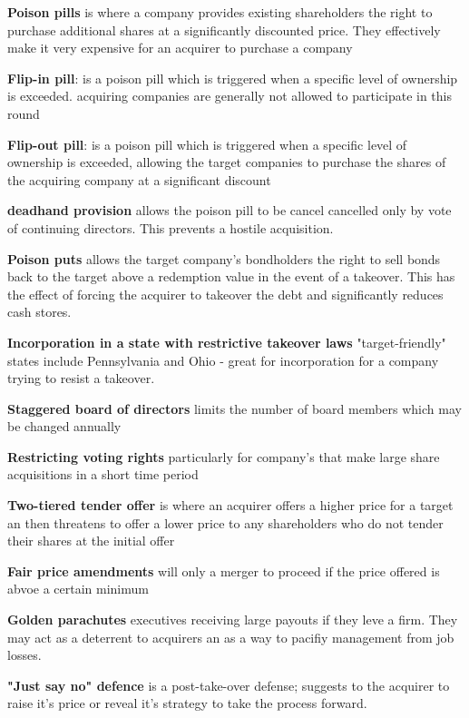 \documentclass[12pt]{article}
\begin{document}
			\textbf{Poison pills} is where a company provides existing shareholders the right to purchase additional shares at a significantly discounted price. They effectively make it very expensive for an acquirer to purchase a company
			
			\textbf{Flip-in pill}: is a poison pill which is triggered when a specific level of ownership is exceeded. acquiring companies are generally not allowed to participate in this round
			
			\textbf{Flip-out pill}: is a poison pill which is triggered when a specific level of ownership is exceeded, allowing the target companies to purchase the shares of the acquiring company at a significant discount
			
			\textbf{deadhand provision} allows the poison pill to be cancel cancelled only by vote of continuing directors. This prevents a hostile acquisition. 
			
			\textbf{Poison puts}  allows the target company's bondholders the right to sell bonds back to the target above a redemption value in the event of a takeover. This has the effect of forcing the acquirer to takeover the debt and significantly reduces cash stores. 
			
			\textbf{Incorporation in a state with restrictive takeover laws} "target-friendly" states include Pennsylvania and Ohio - great for incorporation for a company trying to resist a takeover. 
			
			\textbf{Staggered board of directors} limits the number of board members which may be changed annually 
			
			\textbf{Restricting voting rights} particularly for company's that make large share acquisitions in a short time period
						
			\textbf{Two-tiered tender offer} is where an acquirer offers a higher price for a target an then threatens to offer a lower price to any shareholders who do not tender their shares at the initial offer
			
			\textbf{Fair price amendments} will only a merger to proceed if the price offered is abvoe a certain minimum
			
			\textbf{Golden parachutes} executives receiving large payouts if they leve a firm. They may act as a deterrent to acquirers an as a way to pacifiy management from job losses. 
			
			\textbf{"Just say no" defence} is a post-take-over defense; suggests to the acquirer to raise it's price or reveal it's strategy to take the process forward. 
			
\end{document}
